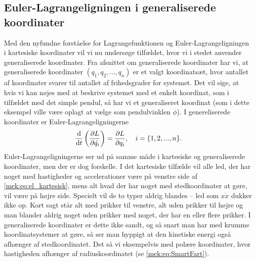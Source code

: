 \subsection*{Euler-Lagrangeligningen i generaliserede koordinater}
Med den nyfundne forståelse for Lagrangefunktionen og Euler-Lagrangeligningen i kartesiske koordinater vil vi nu undersøge tilfældet, hvor vi i stedet anvender generaliserede koordinater. Fra afsnittet om generaliserede koordinater har vi, at generaliserede koordinater $(q_1,q_2,...,q_n)$ er et valgt koordinatsæt, hvor antallet af koordinater svarer til antallet af frihedsgrader for systemet. Det vil sige, at hvis vi kan nøjes med at beskrive systemet med et enkelt koordinat, som i tilfældet med det simple pendul, så har vi et generaliseret koordinat (som i dette eksempel ville være oplagt at vælge som pendulvinklen $\phi$). 
I genereliserede koordinater er Euler-Lagrangeligningerne
%
\begin{align} \label{mek:eq:Euler-Lagrange}
	\dv{}{t} \left( \pdv{L}{\dot{q_i}} \right) = \pdv{L}{q_i}, \quad i = \{1,2,...,n\}.
\end{align}
%
Euler-Lagrangeligningerne ser ud på samme måde i kartesiske og generaliserede koordinater, men der er dog forskelle. I det kartesiske tilfælde vil alle led, der har noget med hastigheder og accelerationer være på venstre side af \cref{mek:eq:el_kartesisk}, mens alt hvad der har noget med stedkoordinater at gøre, vil være på højre side. Specielt vil de to typer aldrig blandes -- led som $x\dot{x}$ dukker ikke op. Kort sagt står alt med prikker til venstre, alt uden prikker til højre og man blander aldrig noget uden prikker med noget, der har en eller flere prikker. I generaliserede koordinater er dette ikke sandt, og så snart man har med krumme koordinatsystemer at gøre, så ser man hyppigt at den kinetiske energi også afhænger af stedkoordinatet. Det så vi eksempelvis med polære koordinater, hvor hastigheden afhænger af radiuskoordinatet (se \cref{mek:eq:SmartFart}).

